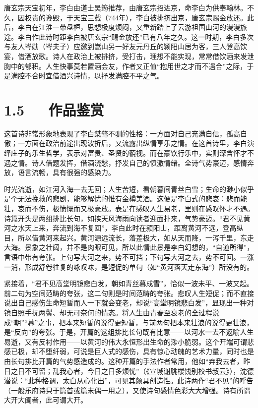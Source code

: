 \documentclass[letterpaper,10pt,english]{sphinxmanual}
\begin{document}
唐玄宗天宝初年，李白由道士吴筠推荐，由唐玄宗招进京，命李白为供奉翰林。不久，因权贵的谗毁，于天宝三载（744年），李白被排挤出京，唐玄宗赐金放还。此后，李白在江淮一带盘桓，思想极度烦闷，又重新踏上了云游祖国山河的漫漫旅途。李白作此诗时距李白被唐玄宗“赐金放还”已有八年之久。这一时期，李白多次与友人岑勋（岑夫子）应邀到嵩山另一好友元丹丘的颍阳山居为客，三人登高饮宴，借酒放歌。诗人在政治上被排挤，受打击，理想不能实现，常常借饮酒来发泄胸中的郁积。人生快事莫若置酒会友，作者又正值“抱用世之才而不遇合”之际，于是满腔不合时宜借酒兴诗情，以抒发满腔不平之气。


\section{1.5   作品鉴赏}
\label{\detokenize{p01_u6563_u6587/_u674e_u767d-_u5c06_u8fdb_u9152:id7}}
这首诗非常形象地表现了李白桀骜不驯的性格：一方面对自己充满自信，孤高自傲；一方面在政治前途出现波折后，又流露出纵情享乐之情。在这首诗里，李白演绎庄子的乐生哲学，表示对富贵、圣贤的藐视。而在豪饮行乐中，实则深含怀才不遇之情。诗人借题发挥，借酒浇愁，抒发自己的愤激情绪。全诗气势豪迈，感情奔放，语言流畅，具有很强的感染力。

时光流逝，如江河入海一去无回；人生苦短，看朝暮间青丝白雪；生命的渺小似乎是个无法挽救的悲剧，能够解忧的惟有金樽美酒。这便是李白式的悲哀：悲而能壮，哀而不伤，极愤慨而又极豪放。表是在感叹人生易老，里则在感叹怀才不遇。诗篇开头是两组排比长句，如挟天风海雨向读者迎面扑来，气势豪迈。“君不见黄河之水天上来，奔流到海不复回”，李白此时在颍阳山，距离黄河不远，登高纵目，所以借黄河来起兴。黄河源远流长，落差极大，如从天而降，一泻千里，东走大海。景象之壮阔，并不是肉眼可见，所以此情此景是李白幻想的，“自道所得”，言语中带有夸张。上句写大河之来，势不可挡；下句写大河之去，势不可回。一涨一消，形成舒卷往复的咏叹味，是短促的单句（如“黄河落天走东海”）所没有的。

紧接着，“君不见高堂明镜悲白发，朝如青丝暮成雪”，恰似一波未平、一波又起。前二句为空间范畴的夸张，这二句则是时间范畴的夸张。悲叹人生短促；而不直接说出自己感伤生命短暂而人一下就会变老，却说“高堂明镜悲白发”，显现出一种对镜自照手抚两鬓、却无可奈何的情态。将人生由青春至衰老的全过程说成“朝”“暮”之事，把本来短暂的说得更短暂，与前两句把本来壮浪的说得更壮浪，是“反向”的夸张。于是，开篇的这组排比长句既有比意——以河水一去不返喻人生易逝，又有反衬作用——以黄河的伟大永恒形出生命的渺小脆弱。这个开端可谓悲感已极，却不堕纤弱，可说是巨人式的感伤，具有惊心动魄的艺术力量，同时也是由长句排比开篇的气势感造成的。这种开篇的手法作者常用，他如“弃我去者，昨日之日不可留；乱我心者，今日之日多烦忧”（《宣城谢朓楼饯别校书叔云》），沈德潜说：“此种格调，太白从心化出”，可见其颇具创造性。此诗两作“君不见”的呼告（一般乐府诗只于篇首或篇末偶一用之），又使诗句感情色彩大大增强。诗有所谓大开大阖者，此可谓大开。
\end{document}
